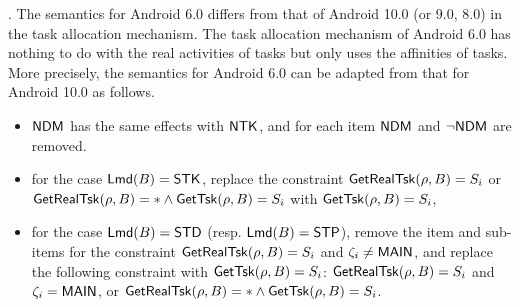 {%

\smallskip

.
The semantics for Android 6.0 differs from that of Android 10.0 (or 9.0, 8.0) in the task allocation mechanism.  %
The task allocation mechanism of Android 6.0 has nothing to do with the real activities of tasks but only uses the affinities of tasks. More precisely, the semantics for Android 6.0 can be adapted from that for Android 10.0 as follows.
\begin{itemize}
    \item ${\sf NDM}$ has the same effects with ${\sf NTK}$, and for each item ${\sf NDM}$ and $\neg{\sf NDM}$ are removed.
	\item for the case ${\sf Lmd}(B) = {\sf STK}$, replace the constraint $\mathsf{GetRealTsk}(\rho, B) = S_i$ or $\mathsf{GetRealTsk}(\rho, B) = * \wedge \mathsf{GetTsk}(\rho, B) = S_i$ with $\mathsf{GetTsk}(\rho, B) = S_i$,
	\item for the case ${\sf Lmd}(B) = {\sf STD}$ (resp.  ${\sf Lmd}(B) = {\sf STP}$),  remove the item and sub-items for the constraint $\mathsf{GetRealTsk}(\rho, B) = S_i$ and $\zeta_i \neq {\sf MAIN}$, and replace  the following constraint with  $ \mathsf{GetTsk}(\rho, B) = S_i$: $\mathsf{GetRealTsk}(\rho, B) = S_i$ and $\zeta_i = {\sf MAIN}$, or $\mathsf{GetRealTsk}(\rho, B) = * \wedge \mathsf{GetTsk}(\rho, B) = S_i$.
\end{itemize}
}


